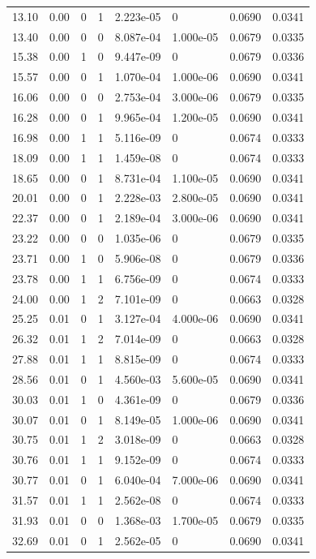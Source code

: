 \documentclass[preview]{standalone}
\begin{document}
{{\begin{tabular}{L{1.2cm}C{1.2cm} C{0.3cm}C{0.5cm} C{1.4cm}C{1.4cm} C{1.4cm}C{1.4cm}}
  13.10  &  0.00  & 0     &  1 &  2.223e-05  & 0  & 0.0690 &  0.0341   \\ 
  13.40  &  0.00  & 0     &  0 &  8.087e-04  & 1.000e-05  & 0.0679 &  0.0335   \\ 
  15.38  &  0.00  & 1     &  0 &  9.447e-09  & 0  & 0.0679 &  0.0336   \\ 
  15.57  &  0.00  & 0     &  1 &  1.070e-04  & 1.000e-06  & 0.0690 &  0.0341   \\ 
  16.06  &  0.00  & 0     &  0 &  2.753e-04  & 3.000e-06  & 0.0679 &  0.0335   \\ 
  16.28  &  0.00  & 0     &  1 &  9.965e-04  & 1.200e-05  & 0.0690 &  0.0341   \\ 
  16.98  &  0.00  & 1     &  1 &  5.116e-09  & 0  & 0.0674 &  0.0333   \\ 
  18.09  &  0.00  & 1     &  1 &  1.459e-08  & 0  & 0.0674 &  0.0333   \\ 
  18.65  &  0.00  & 0     &  1 &  8.731e-04  & 1.100e-05  & 0.0690 &  0.0341   \\ 
  20.01  &  0.00  & 0     &  1 &  2.228e-03  & 2.800e-05  & 0.0690 &  0.0341   \\ 
  22.37  &  0.00  & 0     &  1 &  2.189e-04  & 3.000e-06  & 0.0690 &  0.0341   \\ 
  23.22  &  0.00  & 0     &  0 &  1.035e-06  & 0  & 0.0679 &  0.0335   \\ 
  23.71  &  0.00  & 1     &  0 &  5.906e-08  & 0  & 0.0679 &  0.0336   \\ 
  23.78  &  0.00  & 1     &  1 &  6.756e-09  & 0  & 0.0674 &  0.0333   \\ 
  24.00  &  0.00  & 1     &  2 &  7.101e-09  & 0  & 0.0663 &  0.0328   \\ 
  25.25  &  0.01  & 0     &  1 &  3.127e-04  & 4.000e-06  & 0.0690 &  0.0341   \\ 
  26.32  &  0.01  & 1     &  2 &  7.014e-09  & 0  & 0.0663 &  0.0328   \\ 
  27.88  &  0.01  & 1     &  1 &  8.815e-09  & 0  & 0.0674 &  0.0333   \\ 
  28.56  &  0.01  & 0     &  1 &  4.560e-03  & 5.600e-05  & 0.0690 &  0.0341   \\ 
  30.03  &  0.01  & 1     &  0 &  4.361e-09  & 0  & 0.0679 &  0.0336   \\ 
  30.07  &  0.01  & 0     &  1 &  8.149e-05  & 1.000e-06  & 0.0690 &  0.0341   \\ 
  30.75  &  0.01  & 1     &  2 &  3.018e-09  & 0  & 0.0663 &  0.0328   \\ 
  30.76  &  0.01  & 1     &  1 &  9.152e-09  & 0  & 0.0674 &  0.0333   \\ 
  30.77  &  0.01  & 0     &  1 &  6.040e-04  & 7.000e-06  & 0.0690 &  0.0341   \\ 
  31.57  &  0.01  & 1     &  1 &  2.562e-08  & 0  & 0.0674 &  0.0333   \\ 
  31.93  &  0.01  & 0     &  0 &  1.368e-03  & 1.700e-05  & 0.0679 &  0.0335   \\ 
  32.69  &  0.01  & 0     &  1 &  2.562e-05  & 0  & 0.0690 &  0.0341   \\ 
\hline 
\end{tabular} 

}}
\end{document}
